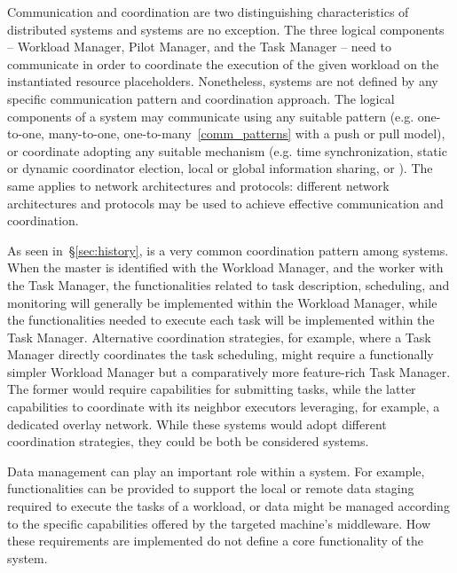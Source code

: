 \documentclass{sig-alternate}
\begin{document}
Communication and coordination are two distinguishing characteristics of
distributed systems and \pilotjob systems are no exception. The three logical
components -- Workload Manager, Pilot Manager, and the Task Manager -- need to
communicate in order to coordinate the execution of the given workload on the
instantiated resource placeholders.  Nonetheless, \pilotjob systems are not
defined by any specific communication pattern and coordination approach. The
logical components of a \pilotjob system may communicate using any suitable
pattern (e.g. one-to-one, many-to-one, one-to-many~\ref{comm_patterns} with a
push or pull model), or coordinate adopting any suitable mechanism (e.g. time
synchronization, static or dynamic coordinator election, local or global
information sharing, or \MW). The same applies to network architectures and
protocols: different network architectures and protocols may be used to achieve
effective communication and coordination.


As seen in~\S\ref{sec:history}, \MW is a very common coordination pattern among
\pilotjob systems. When the master is identified with the Workload Manager, and
the worker with the Task Manager, the functionalities related to task
description, scheduling, and monitoring will generally be implemented within the
Workload Manager, while the functionalities needed to execute each task will be
implemented within the Task Manager. Alternative coordination strategies, for
example, where a Task Manager directly coordinates the task scheduling, might
require a functionally simpler Workload Manager but a comparatively more
feature-rich Task Manager. The former would require capabilities for submitting
tasks, while the latter capabilities to coordinate with its neighbor executors
leveraging, for example, a dedicated overlay network. While these systems would
adopt different coordination strategies, they could be both be considered
\pilotjob systems.

Data management can play an important role within a \pilotjob system. For
example, functionalities can be provided to support the local or remote data
staging required to execute the tasks of a workload, or data might be managed
according to the specific capabilities offered by the targeted machine's
middleware. How these requirements are implemented do not define a core
functionality of the \pilot system.
\end{document}
